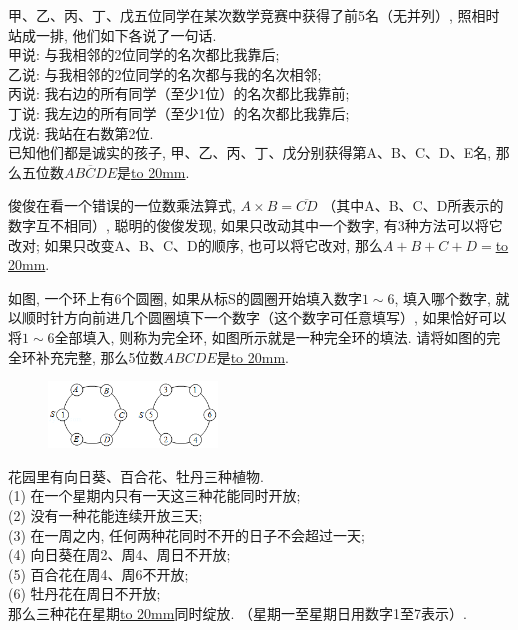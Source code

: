 \item {
    甲、乙、丙、丁、戊五位同学在某次数学竞赛中获得了前5名（无并列）, 照相时站成一排, 他们如下各说了一句话. \\
    甲说: 与我相邻的2位同学的名次都比我靠后; \\
    乙说: 与我相邻的2位同学的名次都与我的名次相邻; \\
    丙说: 我右边的所有同学（至少1位）的名次都比我靠前; \\
    丁说: 我左边的所有同学（至少1位）的名次都比我靠后; \\
    戊说: 我站在右数第2位. \\
    已知他们都是诚实的孩子, 甲、乙、丙、丁、戊分别获得第A、B、C、D、E名, 那么五位数$\overline{ABCDE}$是\underline{\hbox to 20mm{}}.
    \vspace{1cm}
}

\item {
    俊俊在看一个错误的一位数乘法算式, $A\times B=\overline{CD}$ （其中A、B、C、D所表示的数字互不相同）, 聪明的俊俊发现, 如果只改动其中一个数字, 有3种方法可以将它改对; 如果只改变A、B、C、D的顺序, 也可以将它改对, 那么$A+B+C+D=$\underline{\hbox to 20mm{}}.
    \vspace{1cm}
}

\item {
    如图, 一个环上有6个圆圈, 如果从标S的圆圈开始填入数字$1\sim 6$, 填入哪个数字, 就以顺时针方向前进几个圆圈填下一个数字（这个数字可任意填写）, 如果恰好可以将$1\sim 6$全部填入, 则称为完全环, 如图所示就是一种完全环的填法. 请将如图的完全环补充完整, 那么5位数$ABCDE$是\underline{\hbox to 20mm{}}.
    \begin{figure}[H]
        \centering
        \includegraphics[width=0.4\textwidth]{./pics/Chapter_7/2016_3.png}
    \end{figure}
    \vspace{1cm}
}

\item {
    花园里有向日葵、百合花、牡丹三种植物. \\
    (1) 在一个星期内只有一天这三种花能同时开放; \\
    (2) 没有一种花能连续开放三天; \\
    (3) 在一周之内, 任何两种花同时不开的日子不会超过一天; \\
    (4) 向日葵在周2、周4、周日不开放; \\
    (5) 百合花在周4、周6不开放; \\
    (6) 牡丹花在周日不开放; \\
    那么三种花在星期\underline{\hbox to 20mm{}}同时绽放. （星期一至星期日用数字1至7表示）. 
    \vspace{1cm}
}